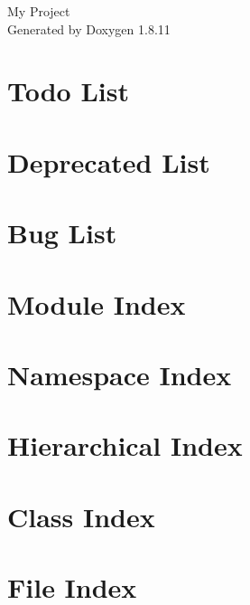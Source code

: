 \documentclass[twoside]{book}
\newcommand{\+}{\discretionary{\mbox{\scriptsize$\hookleftarrow$}}{}{}}
\newcommand{\clearemptydoublepage}{%
  \newpage{\pagestyle{empty}\cleardoublepage}%
}
\begin{document}
\hypersetup{pageanchor=false,
             bookmarksnumbered=true,
             pdfencoding=unicode
            }
\begin{titlepage}
\vspace*{7cm}
\begin{center}%
{\Large My Project }\\
\vspace*{1cm}
{\large Generated by Doxygen 1.8.11}\\
\end{center}
\end{titlepage}
\clearemptydoublepage
\tableofcontents
\clearemptydoublepage
{}
\hypersetup{pageanchor=true}

\chapter{Todo List}
\label{todo}
\hypertarget{todo}{}

\chapter{Deprecated List}
\label{deprecated}
\hypertarget{deprecated}{}

\chapter{Bug List}
\label{bug}
\hypertarget{bug}{}

\chapter{Module Index}

\chapter{Namespace Index}

\chapter{Hierarchical Index}

\chapter{Class Index}

\chapter{File Index}

\end{document}

